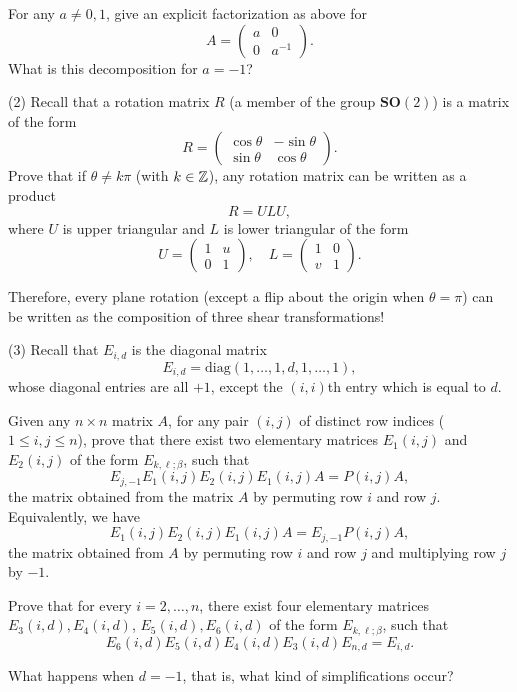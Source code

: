 \documentclass[12pt]{article}
\begin{document}
\medskip
For any $a\not= 0, 1$, give an explicit factorization as above for
\[
A = 
\begin{pmatrix}
a & 0 \\
0 & a^{-1}
\end{pmatrix}.
\]
What is this decomposition for $a = -1$?

\medskip
(2)
Recall that a rotation matrix $R$ (a member of the group
$\mathbf{SO}(2)$)  is a matrix of the form
\[
R = 
\begin{pmatrix}
\cos\theta & -\sin\theta \\
\sin\theta & \cos\theta
\end{pmatrix}.
\]
Prove that if $\theta \not= k \pi$ (with $k \in {\mathbb Z}$), 
any rotation matrix can be written as a product 
\[
R = U L U,
\] 
where $U$ is upper triangular and $L$ is lower triangular 
of the form
\[
U = 
\begin{pmatrix}
1 & u \\
0 & 1
\end{pmatrix},
\quad
L = 
\begin{pmatrix}
1 & 0 \\
v & 1
\end{pmatrix}.
\]

\medskip
Therefore, every plane rotation (except a flip about the origin when 
$\theta = \pi$) can be written as the composition of three
shear transformations!

\medskip
(3)
Recall that $E_{i, d}$ is  the diagonal matrix
\[
E_{i, d} = \mathrm{diag}(1,\ldots, 1, d, 1, \ldots,  1),
\]
whose diagonal entries are all $+1$, except the $(i, i)$th entry which
is equal to $d$.

\medskip
Given any $n\times n$ matrix $A$, for any pair $(i, j)$ of distinct
row indices ($1 \leq i, j \leq n$), 
prove that there exist two elementary matrices $E_1(i,j)$ and $E_2(i,j)$
of the form $E_{k,\ell; \beta}$, 
such that
\[
E_{j,-1} E_1(i,j)E_2(i,j)E_1(i,j) A = P(i, j) A,
\]
the matrix obtained from the matrix $A$ by permuting row $i$ and row $j$.
Equivalently, we have
\[
 E_1(i,j)E_2(i,j)E_1(i,j) A = E_{j,-1}P(i, j) A,
\]
the matrix obtained from $A$ by permuting row $i$ and row $j$ and
multiplying row $j$ by $-1$.

\medskip
Prove that for every $i = 2, \ldots, n$, there exist four elementary matrices
$E_3(i,d), E_4(i,d)$, $E_5(i,d), E_6(i,d)$  of the form $E_{k,\ell; \beta}$, 
such that
\[
E_6(i,d)E_5(i,d)E_4(i,d)E_3(i,d) E_{n,d} = E_{i, d}.
\]

What happens when $d = -1$, that is, what kind of simplifications occur?
\end{document}

